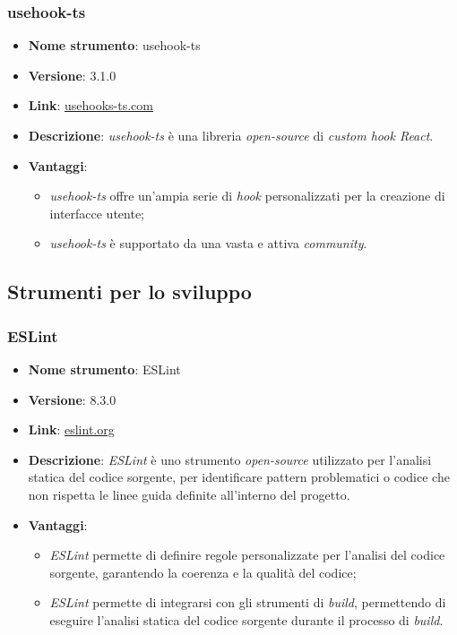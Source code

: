 \subsubsection{usehook-ts}
\begin{itemize}
    \item \textbf{Nome strumento}: usehook-ts
    \item \textbf{Versione}: 3.1.0
    \item \textbf{Link}: \href{https://usehooks-ts.com/}{usehooks-ts.com}
    \item \textbf{Descrizione}: \textit{usehook-ts} è una libreria \textit{open-source} di \textit{custom hook React}.
    \item \textbf{Vantaggi}:
          \begin{itemize}
              \item \textit{usehook-ts} offre un'ampia serie di \textit{hook} personalizzati per la creazione di interfacce utente;
              \item \textit{usehook-ts} è supportato da una vasta e attiva \textit{community}.
          \end{itemize}
\end{itemize}

\subsection{Strumenti per lo sviluppo}

\subsubsection{ESLint}
\begin{itemize}
    \item \textbf{Nome strumento}: ESLint
    \item \textbf{Versione}: 8.3.0
    \item \textbf{Link}: \href{https://eslint.org/}{eslint.org}
    \item \textbf{Descrizione}: \textit{ESLint} è uno strumento \textit{open-source} utilizzato per l'analisi statica del codice sorgente, per identificare pattern problematici o codice che non rispetta
          le linee guida definite all'interno del progetto.
    \item \textbf{Vantaggi}:
          \begin{itemize}
              \item \textit{ESLint} permette di definire regole personalizzate per l'analisi del codice sorgente, garantendo la coerenza e la qualità del codice;
              \item \textit{ESLint} permette di integrarsi con gli strumenti di \textit{build}, permettendo di eseguire l'analisi statica del codice sorgente durante il processo di \textit{build}.
          \end{itemize}
\end{itemize}

